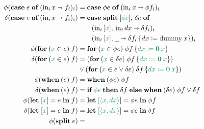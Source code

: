 \documentclass{rntz}\usepackage[a5]{rntzgeometry}\usepackage[fullwidth=130mm,width=330pt,]{narrow}
\newcommand\mathvar[1]{\ensuremath{#1}} %
\newcommand\isocolor{\color{ForestGreen}} %
\newcommand\injc{\text{in}}
\newcommand\inj[1]{\injc_{#1}\,}
\newcommand\zero{\ensuremath{\mathbold{0}}}
\newcommand\<{\mskip 4mu plus 4mu minus 1mu}
\newcommand\dx{\mathvar{dx}}
\newcommand\dy{\mathvar{dy}}
\newcommand\fname\text
\newcommand\dummy{\fname{dummy}}
\newcommand\extract{{\color{Red}\fname{extract}}}
\newcommand\fnspace{\;}
\newcommand\kwname\textbf
\newcommand\efor[1]{\kwname{for}\:({#1})\fnspace}
\newcommand\ewhen[1]{\kwname{when}\:({#1})\fnspace}
\newcommand\ecase[1]{\kwname{case} \;{#1}\; \kwname{of}\;}
\newcommand\caseto\shortrightarrow
\newcommand\eif[2]{\kwname{if}\;{#1}\;\kwname{then}\;{#2}\;\kwname{else}\;}
\newcommand\ebox[1]{[{#1}]}
\newcommand\elet[1]{\kwname{let}\;#1\;\kwname{in}\;}
\newcommand\eboxd[1]{\ebox{\isocolor #1}}
\newcommand\eford[2]{\efor{{\isocolor #1} \in #2}}
\newcommand\eifd[2]{\eif{\isocolor #1}{#2}}
\newcommand\pwild{\underline{\phantom{a}}}
\newcommand\etuple[1]{\langle{#1}\rangle}
\newcommand\splitsum{\kwname{split}\<}
\newcommand\subst[2]{{#1}\,\{{#2}\}}
\newcommand\substd[2]{\subst{#1}{\isocolor #2}}
\newcommand\substo\coloneqq
\begin{document}
\begin{figure*}
  \begin{align*}
    \phi(\ecase e (\inj i x \caseto f_i)_i)
    &= \ecase{\phi e} (\inj i x \caseto \phi f_i)_i
    \\
    \delta(\ecase e (\inj i x \caseto f_i)_i)
    &= \ecase{\splitsum{\eboxd{\phi e}},\, \delta e}\\
    &\qquad ({\inj i {\eboxd x},\, \inj i \dx} \caseto \delta f_i)_i\\
    &\qquad ({\inj i {\eboxd x},\, \pwild}
      \caseto \subst{\delta f_i}{\dx \substo \dummy\<x})_i
    \\
    \phi(\eford x e f)
    &= \eford{x}{\phi e} %
    \substd{\phi f}{\dx \substo \zero\<x}
    \\
    \delta(\eford x e f)
    &= (\eford x{\delta e} \substd{\phi f}{\dx \substo \zero\<x}) \\
    &\vee (\eford x{e \vee \delta e} %
    \substd{\delta f}{\dx \substo \zero\<x})
    \\
    \phi(\ewhen e f) &= \ewhen{\phi e} \phi f
    \\
    \delta(\ewhen e f)
    &= \eifd{\phi e}{\delta f} \ewhen{\delta e} \phi f \vee \delta f
    \\
    \phi(\elet{\eboxd x = e} f) &= \elet{\eboxd{\etuple{x,\dx}} = \phi e} \phi f
    \\
    \delta(\elet{\eboxd x = e} f)
    &= \elet{\eboxd{\etuple{x,\dx}} = \phi e} \delta f
    \\
    \phi(\splitsum e) &=

\end{align*}
\end{figure*}
\end{document}
